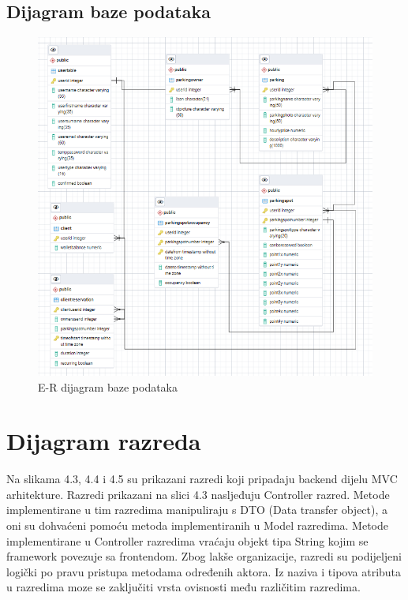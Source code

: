 \subsection{Dijagram baze podataka}


\begin{figure}[H]
	
	\includegraphics[width=\textwidth]{slike/db.png} %
	\centering
	\caption{E-R dijagram baze podataka}
	\label{fig:dijagramBP}
\end{figure}

\eject



\section{Dijagram razreda}

Na slikama 4.3, 4.4 i 4.5 su prikazani razredi koji pripadaju backend dijelu MVC
arhitekture. Razredi prikazani na slici 4.3 nasljeđuju Controller razred. Metode
implementirane u tim razredima manipuliraju s DTO (Data transfer object), a oni
su dohvaćeni pomoću metoda implementiranih u Model razredima. Metode implementirane u Controller razredima vraćaju objekt tipa String kojim se framework povezuje sa frontendom. Zbog lakše organizacije, razredi su podijeljeni logički po pravu pristupa metodama određenih aktora. Iz naziva i tipova atributa u razredima moze se zaključiti vrsta ovisnosti među različitim razredima.

